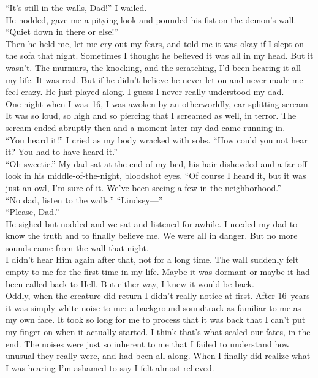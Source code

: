 \documentclass[a5paper]{scrartcl}
\begin{document}
\enquote{It's still in the walls, Dad!} I wailed.\\


He nodded, gave me a pitying look and pounded his fist on the demon's wall. \enquote{Quiet down in there or else!} \\


Then he held me, let me cry out my fears, and told me it was okay if I slept on the sofa that night. Sometimes I thought he believed it was all in my head. But it wasn't. The murmurs, the knocking, and the scratching, I'd been hearing it all my life. It was real. But if he didn't believe he never let on and never made me feel crazy. He just played along. I guess I never really understood my dad. \\


One night when I was~16, I was awoken by an otherworldly, ear-splitting scream. It was so loud, so high and so piercing that I screamed as well, in terror. The scream ended abruptly then and a moment later my dad came running in.\\


\enquote{You heard it!} I cried as my body wracked with sobs. \enquote{How could you not hear it? You had to have heard it.}\\


\enquote{Oh sweetie.} My dad sat at the end of my bed, his hair disheveled and a far-off look in his middle-of-the-night, bloodshot eyes. \enquote{Of course I heard it, but it was just an owl, I'm sure of it. We've been seeing a few in the neighborhood.}\\


\enquote{No dad, listen to the walls.} 
\enquote{Lindsey---}\\


\enquote{Please, Dad.}\\


He sighed but nodded and we sat and listened for awhile. I needed my dad to know the truth and to finally believe me. We were all in danger.
But no more sounds came from the wall that night.\\


I didn't hear Him again after that, not for a long time. The wall suddenly felt empty to me for the first time in my life. Maybe it was dormant or maybe it had been called back to Hell. But either way, I knew it would be back.\\


Oddly, when the creature did return I didn't really notice at first. After 16~years it was simply white noise to me: a background soundtrack as familiar to me as my own face. It took so long for me to process that it was back that I can't put my finger on when it actually started. I think that's what sealed our fates, in the end. The noises were just so inherent to me that I failed to understand how unusual they really were, and had been all along. When I finally did realize what I was hearing I'm ashamed to say I felt almost relieved. \\
\end{document}
